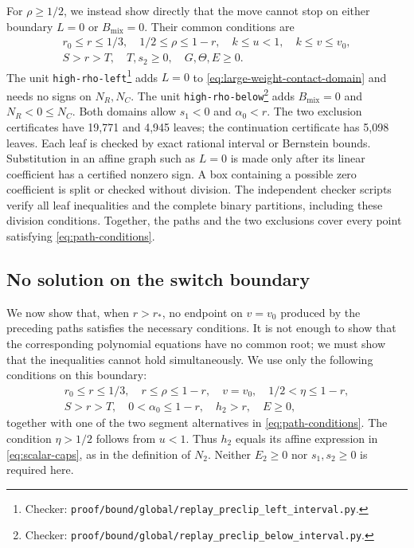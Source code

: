 \documentclass[11pt]{article}
\theoremstyle{remark}
\theoremstyle{plain}
\begin{document}
For $\rho\ge1/2$, we instead show directly that the move cannot
stop on either boundary $L=0$ or $B_{\mathrm{mix}}=0$. Their common conditions are
\begin{equation}
 \begin{gathered}
 r_0\le r\le1/3,\quad 1/2\le\rho\le1-r,\quad
 k\le u<1,\quad k\le v\le v_0,\\
 S>r>T,\quad T,s_2\ge0,\quad G,\Theta,E\ge0.
 \end{gathered}
 \label{eq:large-weight-contact-domain}
\end{equation}
The unit \nolinkurl{high-rho-left}\footnote{Checker:
\nolinkurl{proof/bound/global/replay_preclip_left_interval.py}.\label{fn:checker-high-rho-left}} adds $L=0$ to
\eqref{eq:large-weight-contact-domain} and needs no signs on
$N_R,N_C$. The unit \nolinkurl{high-rho-below}\footnote{Checker:
\nolinkurl{proof/bound/global/replay_preclip_below_interval.py}.\label{fn:checker-high-rho-below}} adds
$B_{\mathrm{mix}}=0$ and $N_R<0\le N_C$.
Both domains allow $s_1<0$ and $\alpha_0<r$.
The two exclusion certificates have 19,771 and 4,945 leaves;
the continuation certificate has 5,098 leaves.
Each leaf is checked by exact rational interval or Bernstein bounds.
Substitution in an affine graph such as $L=0$ is made only after
its linear coefficient has a certified nonzero sign. A box containing
a possible zero coefficient is split or checked without division.
The independent checker scripts verify all leaf inequalities and the
complete binary partitions, including these division conditions.
Together, the paths and the two exclusions cover every point
satisfying \eqref{eq:path-conditions}.

\subsection{No solution on the switch boundary}
\label{app:switch}

We now show that, when $r>r_*$, no endpoint on $v=v_0$ produced by
the preceding paths satisfies the necessary conditions. It is not
enough to show that the corresponding polynomial equations have no
common root; we must show that the inequalities cannot hold
simultaneously.
We use only the following conditions on this boundary:
\begin{equation}
 \begin{gathered}
 r_0\le r\le1/3,\quad r\le\rho\le1-r,\quad
 v=v_0,\quad 1/2<\eta\le1-r,\\
 S>r>T,\quad 0<\alpha_0\le1-r,\quad h_2>r,\quad E\ge0,
 \end{gathered}
 \label{eq:switch-domain}
\end{equation}
together with one of the two segment alternatives in
\eqref{eq:path-conditions}. The condition $\eta>1/2$ follows from
$u<1$. Thus $h_2$ equals its affine expression in
\eqref{eq:scalar-caps}, as in the definition of $N_2$.
Neither $E_2\ge0$ nor $s_1,s_2\ge0$ is required here.
\end{document}
